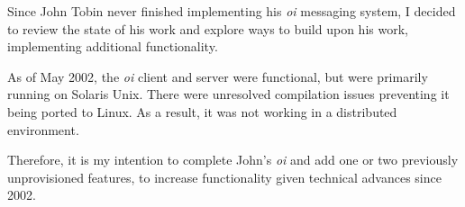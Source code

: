 
Since John Tobin never finished implementing his \emph{oi} messaging
system, I decided to review the state of his work and explore ways to
build upon his work, implementing additional functionality.


As of May 2002, the \emph{oi} client and server were functional, but
were primarily running on Solaris Unix. There were unresolved
compilation issues preventing it being ported to Linux. As a result, it
was not working in a distributed environment.


Therefore, it is my intention to complete John's \emph{oi} and add one
or two previously unprovisioned features, to increase functionality
given technical advances since 2002.
